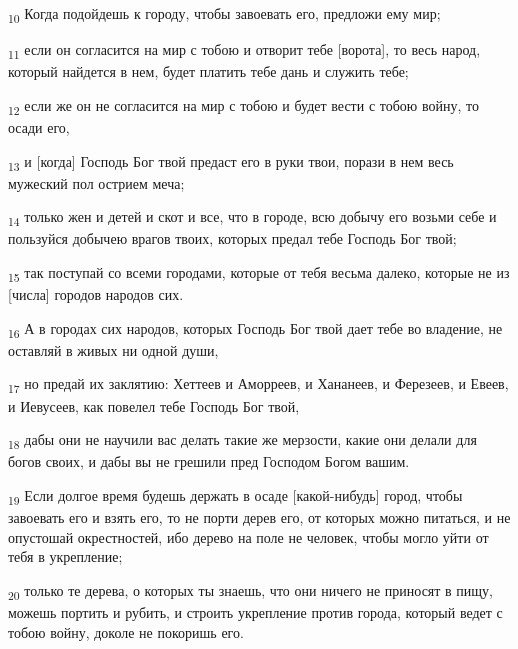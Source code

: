 \begin{tcolorbox}
\textsubscript{10} Когда подойдешь к городу, чтобы завоевать его, предложи ему мир;
\end{tcolorbox}
\begin{tcolorbox}
\textsubscript{11} если он согласится на мир с тобою и отворит тебе [ворота], то весь народ, который найдется в нем, будет платить тебе дань и служить тебе;
\end{tcolorbox}
\begin{tcolorbox}
\textsubscript{12} если же он не согласится на мир с тобою и будет вести с тобою войну, то осади его,
\end{tcolorbox}
\begin{tcolorbox}
\textsubscript{13} и [когда] Господь Бог твой предаст его в руки твои, порази в нем весь мужеский пол острием меча;
\end{tcolorbox}
\begin{tcolorbox}
\textsubscript{14} только жен и детей и скот и все, что в городе, всю добычу его возьми себе и пользуйся добычею врагов твоих, которых предал тебе Господь Бог твой;
\end{tcolorbox}
\begin{tcolorbox}
\textsubscript{15} так поступай со всеми городами, которые от тебя весьма далеко, которые не из [числа] городов народов сих.
\end{tcolorbox}
\begin{tcolorbox}
\textsubscript{16} А в городах сих народов, которых Господь Бог твой дает тебе во владение, не оставляй в живых ни одной души,
\end{tcolorbox}
\begin{tcolorbox}
\textsubscript{17} но предай их заклятию: Хеттеев и Аморреев, и Хананеев, и Ферезеев, и Евеев, и Иевусеев, как повелел тебе Господь Бог твой,
\end{tcolorbox}
\begin{tcolorbox}
\textsubscript{18} дабы они не научили вас делать такие же мерзости, какие они делали для богов своих, и дабы вы не грешили пред Господом Богом вашим.
\end{tcolorbox}
\begin{tcolorbox}
\textsubscript{19} Если долгое время будешь держать в осаде [какой-нибудь] город, чтобы завоевать его и взять его, то не порти дерев его, от которых можно питаться, и не опустошай окрестностей, ибо дерево на поле не человек, чтобы могло уйти от тебя в укрепление;
\end{tcolorbox}
\begin{tcolorbox}
\textsubscript{20} только те дерева, о которых ты знаешь, что они ничего не приносят в пищу, можешь портить и рубить, и строить укрепление против города, который ведет с тобою войну, доколе не покоришь его.
\end{tcolorbox}
